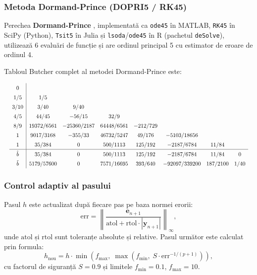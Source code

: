 \subsubsection{Metoda Dormand-Prince (DOPRI5 / RK45)}

Perechea \textbf{Dormand-Prince} \cite{dormandprince1980}, implementată ca
\texttt{ode45} în MATLAB, \texttt{RK45} în SciPy (Python), \texttt{Tsit5}
în Julia și \texttt{lsoda}/\texttt{ode45} în R (pachetul \texttt{deSolve}),
utilizează 6 evaluări de funcție și are ordinul principal 5 cu estimator
de eroare de ordinul 4.

Tabloul Butcher complet al metodei Dormand-Prince este:

\begin{equation}
\label{eq:butcher_dopri5}
\renewcommand{\arraystretch}{1.4}
\resizebox{\columnwidth}{!}{$
\begin{array}{c|ccccccc}
    0       &              &             &            &           &             &          & \\
    1/5     & 1/5          &             &            &           &             &          & \\
    3/10    & 3/40         & 9/40        &            &           &             &          & \\
    4/5     & 44/45        & -56/15      & 32/9       &           &             &          & \\
    8/9     & 19372/6561   & -25360/2187 & 64448/6561 & -212/729  &             &          & \\
    1       & 9017/3168    & -355/33     & 46732/5247 & 49/176    & -5103/18656 &          & \\
    1       & 35/384       & 0           & 500/1113   & 125/192   & -2187/6784  & 11/84    & \\
    \hline
    \hat{b} & 35/384       & 0           & 500/1113   & 125/192   & -2187/6784  & 11/84    & 0 \\
    \tilde{b}& 5179/57600  & 0           & 7571/16695 & 393/640   & -92097/339200 & 187/2100 & 1/40
\end{array}
$}
\end{equation}

\subsubsection{Control adaptiv al pasului}

Pasul $h$ este actualizat după fiecare pas pe baza normei erorii:
\begin{equation}
    \text{err} = \left\|\frac{\mathbf{e}_{n+1}}{\text{atol} + \text{rtol} \cdot |\mathbf{y}_{n+1}|}\right\|_\infty,
\end{equation}
unde $\text{atol}$ și $\text{rtol}$ sunt toleranțe absolute și relative.
Pasul următor este calculat prin formula:
\begin{equation}
    h_{\text{nou}} = h \cdot \min\!\left(f_{\max},\; \max\!\left(f_{\min},\; S \cdot \text{err}^{-1/(p+1)}\right)\right),
\end{equation}
cu factorul de siguranță $S = 0.9$ și limitele $f_{\min} = 0.1$, $f_{\max} = 10$.

